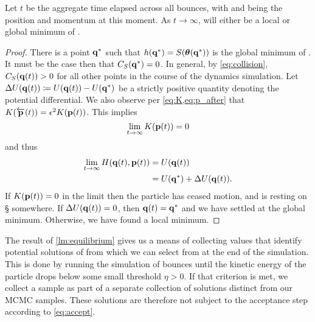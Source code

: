 \begin{lemma}
    \label{lm:equilibrium}
    Let $t$ be the aggregate time elapsed across all bounces, with \qt{} and
    \pt{} being the position and momentum at this moment. As $t \rightarrow
    \infty$, \thetaof{\qt{}} will either be a local or global minimum of
    \surface{}.
\end{lemma}
\begin{proof}
    There is a point $\mathbf{q}{}^*$ such that $h(\mathbf{q}{}^*) = S(\boldsymbol{\theta}(\mathbf{q}{}^*))$
    is the global minimum of \surface. It must be the case then that
    $C_{S}({\mathbf{q}{}^*}) = 0$. In general, by \cref{eq:collision}, $C_{S}({\mathbf{q}(t){}}) > 0$
    for all other points in the course of the dynamics simulation. Let $\Delta
    U(\mathbf{q}(t){}) \coloneqq U(\mathbf{q}(t){}) - U(\mathbf{q}{}^*)$ be a strictly positive quantity
    denoting the potential differential. We also observe per
    \cref{eq:K,eq:p_after} that $K(\overleftarrow{\mathbf{p}}(t)) = \epsilon^2
    K(\mathbf{p}(t){})$. This implies
    \begin{equation*}
        \lim_{t \rightarrow \infty} K(\mathbf{p}(t){}) = 0
    \end{equation*}
    and thus
    \begin{align*}
        \lim_{t \rightarrow \infty} H(\mathbf{q}(t){}, \mathbf{p}(t){}) &= U(\mathbf{q}(t){}) \\
        &= U(\mathbf{q}{}^*) + \Delta U(\mathbf{q}(t){}).
    \end{align*}
    If $K(\mathbf{p}(t){}) = 0$ in the limit then the particle has ceased motion, and is
    resting on \S{} somewhere. If $\Delta U(\mathbf{q}(t){}) = 0$, then $\mathbf{q}(t){} = \mathbf{q}{}^*$
    and we have settled at the global minimum. Otherwise, we have found a local
    minimum.
\end{proof}

The result of \cref{lm:equilibrium} gives us a means of collecting values
\thetab{} that identify potential solutions of \target{} from which we can
select from at the end of the simulation. This is done by running the simulation
of bounces until the kinetic energy of the particle drops below some small
threshold $\eta > 0$. If that criterion is met, we collect a sample as part of a
separate collection of solutions distinct from our MCMC samples. These solutions
are therefore not subject to the acceptance step according to \cref{eq:accept}.

